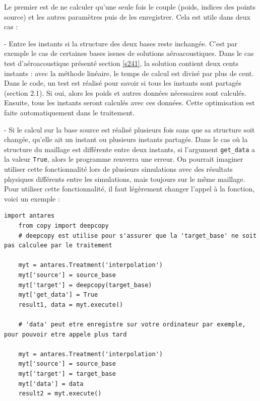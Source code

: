 Le premier est de ne calculer qu'une seule fois le couple (poids, indices des points source) et les autres paramètres puis de les enregistrer. Cela est utile dans deux cas : %

- Entre les instants si la structure des deux bases reste inchangée.
C'est par exemple le cas de certaines bases issues de solutions aéroacoustiques. Dans le cas test d'aéroacoustique présenté section \ref{s241}, la solution contient deux cents instants : avec la méthode linéaire, le temps de calcul est divisé par plus de cent. Dans le code, un test est réalisé pour savoir si tous les instants sont partagés (section 2.1). Si oui, alors les poids et autres données nécessaires sont calculés. Ensuite, tous les instants seront calculés avec ces données.
Cette optimisation est faite automatiquement dans le traitement.

- Si le calcul sur la base source est réalisé plusieurs fois sans que sa structure soit changée, qu'elle ait un instant ou plusieurs instants partagés. Dans le cas où la structure du maillage est différente entre deux instants, si l'argument \texttt{get\_data} a la valeur \texttt{True}, alors le programme renverra une erreur.
On pourrait imaginer utiliser cette fonctionnalité lors de plusieurs simulations avec des résultats physiques différents entre les simulations, mais toujours sur le même maillage. Pour utiliser cette fonctionnalité, il faut légèrement changer l'appel à la fonction, voici un exemple :

\begin{lstlisting}[caption=Exemple de réutilisation des données, label={lst:antares}]
    import antares
    from copy import deepcopy
    # deepcopy est utilise pour s'assurer que la 'target_base' ne soit pas calculee par le traitement

    myt = antares.Treatment('interpolation')
    myt['source'] = source_base
    myt['target'] = deepcopy(target_base)
    myt['get_data'] = True
    result1, data = myt.execute()

    # 'data' peut etre enregistre sur votre ordinateur par exemple, pour pouvoir etre appele plus tard

    myt = antares.Treatment('interpolation')
    myt['source'] = source_base
    myt['target'] = target_base
    myt['data'] = data
    result2 = myt.execute()
\end{lstlisting}

